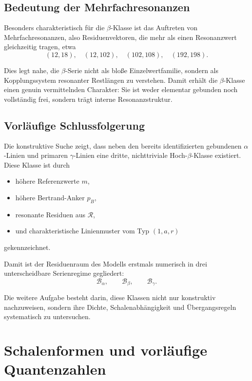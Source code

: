 \documentclass[11pt,a4paper]{article}
\theoremstyle{definition}
\theoremstyle{plain}
\theoremstyle{remark}
\begin{document}
	\subsection{Bedeutung der Mehrfachresonanzen}
	
	Besonders charakteristisch für die \(\beta\)-Klasse ist das Auftreten von Mehrfachresonanzen, also Residuenvektoren, die mehr als einen Resonanzwert gleichzeitig tragen, etwa
	\[
	(12,18),\quad
	(12,102),\quad
	(102,108),\quad
	(192,198).
	\]
	
	Dies legt nahe, die \(\beta\)-Serie nicht als bloße Einzelwertfamilie, sondern als Kopplungssystem resonanter Restlängen zu verstehen. 
	Damit erhält die \(\beta\)-Klasse einen genuin vermittelnden Charakter: 
	Sie ist weder elementar gebunden noch vollständig frei, sondern trägt interne Resonanzstruktur.
	
	\subsection{Vorläufige Schlussfolgerung}
	
	Die konstruktive Suche zeigt, dass neben den bereits identifizierten gebundenen \(\alpha\)-Linien und primaren \(\gamma\)-Linien eine dritte, nichttriviale Hoch-\(\beta\)-Klasse existiert. 
	Diese Klasse ist durch
	
	\begin{itemize}
		\item höhere Referenzwerte \(m\),
		\item höhere Bertrand-Anker \(p_B\),
		\item resonante Residuen aus \(\mathcal R\),
		\item und charakteristische Linienmuster vom Typ \((1,a,r)\)
	\end{itemize}
	
	gekennzeichnet.
	
	Damit ist der Residuenraum des Modells erstmals numerisch in drei unterscheidbare Serienregime gegliedert:
	\[
	\mathcal B_\alpha,\qquad
	\mathcal B_\beta,\qquad
	\mathcal B_\gamma.
	\]
	
	Die weitere Aufgabe besteht darin, diese Klassen nicht nur konstruktiv nachzuweisen, sondern ihre Dichte, Schalenabhängigkeit und Übergangsregeln systematisch zu untersuchen.
	
	\section{Schalenformen und vorläufige Quantenzahlen}
	
\end{document}
